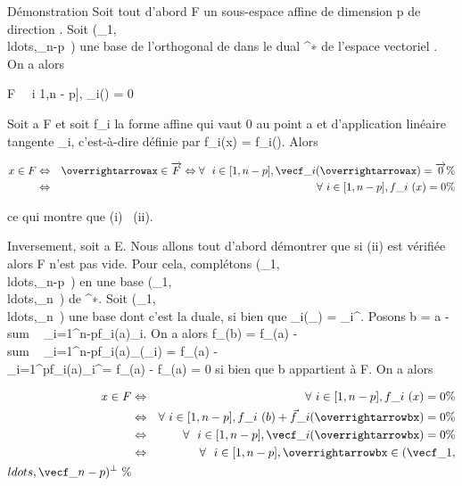 \documentclass[]{article}
\begin{document}
Démonstration Soit tout d'abord F un sous-espace affine de dimension p
de direction \overrightarrowF. Soit
(\vecf\_1,\\ldots,\vecf\_n-p~)
une base de l'orthogonal de \overrightarrowF dans le
dual \overrightarrowE^∗ de l'espace
vectoriel \overrightarrowE. On a alors

\overrightarrow\xi \in\overrightarrow
F \Leftrightarrow \forall~~i \in {[}1,n -
p{]},
\vecf\_i(\overrightarrow\xi)
= 0

Soit a \in F et soit f\_i la forme affine qui vaut 0 au point a et
d'application linéaire tangente \vecf\_i,
c'est-à-dire définie par f\_i(x) =\vec
f\_i(\overrightarrowax). Alors

\begin{align*} x \in F& \Leftrightarrow
& \overrightarrowax
\in\overrightarrow F \Leftrightarrow
\forall~~i \in {[}1,n - p{]},
\vecf\_i(\overrightarrowax)
=\overrightarrow 0\%&
\\ & \Leftrightarrow &
\forall~i \in {[}1,n - p{]}, f\_i~(x) = 0 \%&
\\ \end{align*}

ce qui montre que (i) \rigtharrow~(ii).

Inversement, soit a \in E. Nous allons tout d'abord démontrer que si (ii)
est vérifiée alors F n'est pas vide. Pour cela, complétons
(\vecf\_1,\\ldots,\vecf\_n-p~)
en une base
(\vecf\_1,\\ldots,\vecf\_n~)
de \overrightarrowE^∗. Soit
(\vece\_1,\\ldots,\vece\_n~)
une base dont c'est la duale, si bien que
\vecf\_i(\vece\_\jmath)
= \delta\_i^\jmath. Posons b = a
-\\sum ~
\_i=1^n-pf\_i(a)\vece\_i.
On a alors f\_\jmath(b) = f\_\jmath(a)
-\\sum ~
\_i=1^n-pf\_i(a)\vecf\_\jmath(\vece\_i)
= f\_\jmath(a) -\\\sum
 \_i=1^pf\_i(a)\delta\_i^\jmath =
f\_\jmath(a) - f\_\jmath(a) = 0 si bien que b appartient à F. On a
alors

\begin{align*} x \in F& \Leftrightarrow
& \forall~i \in {[}1,n - p{]}, f\_i~(x) = 0
\%& \\ & \Leftrightarrow &
\forall~i \in {[}1,n - p{]}, f\_i~(b)
+\vec
f\_i(\overrightarrowbx) = 0 \%&
\\ & \Leftrightarrow &
\forall~~i \in {[}1,n - p{]},
\vecf\_i(\overrightarrowbx)
= 0 \%& \\ &
\Leftrightarrow & \forall~~i \in {[}1,n -
p{]}, \overrightarrowbx \in
(\vecf\_1,\\ldots,\vecf\_n-p)^\bot~\%&
\\ \end{align*}
\end{document}
